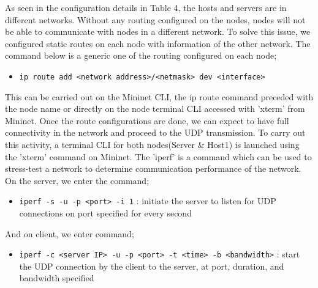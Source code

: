 \documentclass{article}
\begin{document}
\par As seen in the configuration details in Table 4, the hosts and servers are in different networks. Without any routing configured on the nodes, nodes will not be able to communicate with nodes in a different network. To solve this issue, we configured static routes on each node with information of the other network. The command below is a generic one of the routing configured on each node; 
	\begin{itemize}
		\centering
		\item \texttt{ip route add <network address>/<netmask>  dev <interface>}
	\end{itemize}
This can be carried out on the Mininet CLI, the ip route command preceded with the node name or directly on the node terminal CLI accessed with 'xterm' from Mininet. Once the route configurations are done, we can expect to have full connectivity in the network and proceed to the UDP transmission. To carry out this activity, a terminal CLI for both nodes(Server \& Host1) is launched using the 'xterm' command on Mininet. The 'iperf' is a command which can be used to stress-test a network to determine communication performance of the network. \\ On the server, we enter the command; 
	\begin{itemize}
		\item \texttt{iperf -s -u -p <port> -i 1} : initiate the server to listen for UDP connections on port specified for every second
	\end{itemize}
And on client, we enter command;
	\begin{itemize}
		\item \texttt{iperf -c <server IP> -u -p <port> -t <time> -b <bandwidth>} : start the UDP connection by the client to the server, at port, duration, and bandwidth specified
	\end{itemize}
\end{document}
